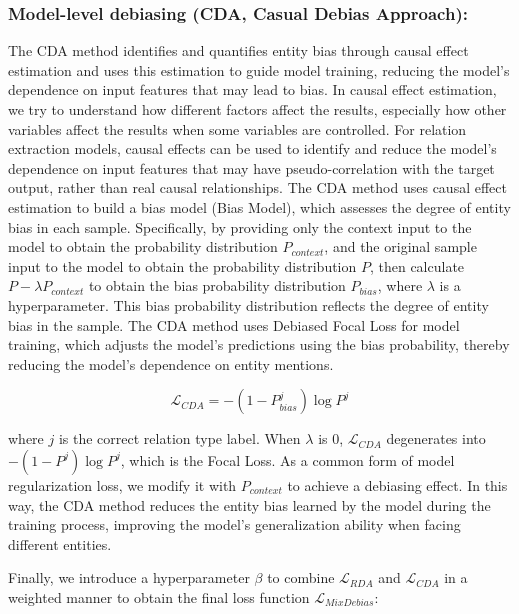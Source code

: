 \documentclass[letterpaper]{article} %
\begin{document}
\subsubsection{Model-level debiasing (CDA, Casual Debias Approach):}
The CDA method identifies and quantifies entity bias through causal effect estimation and uses this estimation to guide model training, reducing the model's dependence on input features that may lead to bias. In causal effect estimation, we try to understand how different factors affect the results, especially how other variables affect the results when some variables are controlled. For relation extraction models, causal effects can be used to identify and reduce the model's dependence on input features that may have pseudo-correlation with the target output, rather than real causal relationships. The CDA method uses causal effect estimation to build a bias model (Bias Model), which assesses the degree of entity bias in each sample. Specifically, by providing only the context input to the model to obtain the probability distribution \( P_{context} \), and the original sample input to the model to obtain the probability distribution \( P \), then calculate \( P - \lambda P_{context} \) to obtain the bias probability distribution \( P_{bias} \), where \( \lambda \) is a hyperparameter. This bias probability distribution reflects the degree of entity bias in the sample. The CDA method uses Debiased Focal Loss \cite{mahabadi2020end} for model training, which adjusts the model's predictions using the bias probability, thereby reducing the model's dependence on entity mentions.

\begin{equation}
    \mathcal{L}_{CDA} = -(1 - P_{bias}^j) \log P^j
\end{equation}

\noindent where \( j \) is the correct relation type label. When \( \lambda \) is 0, \( \mathcal{L}_{CDA} \) degenerates into \( -(1 - P^j) \log P^j \), which is the Focal Loss. As a common form of model regularization loss, we modify it with \( P_{context} \) to achieve a debiasing effect. In this way, the CDA method reduces the entity bias learned by the model during the training process, improving the model's generalization ability when facing different entities.

Finally, we introduce a hyperparameter \( \beta \) to combine \( \mathcal{L}_{RDA} \) and \( \mathcal{L}_{CDA} \) in a weighted manner to obtain the final loss function \( \mathcal{L}_{MixDebias} \):
\end{document}
